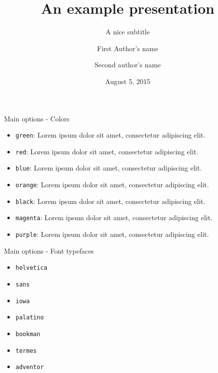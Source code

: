 \documentclass[10pt,numbering,toc]{bpslides}
\title[Short title]{An example presentation}
\subtitle{A nice subtitle}
\author[Short Authors Name]{First Author's name\inst{1} \and Second author's name\inst{2}}
\institute{\inst{1} First institute\vs\\\inst{2} Second institute}
\date[Short date]{August 5, 2015}
\begin{document}
\begin{frame}[plain]
	\titlepage
\end{frame}

\begin{frame}{Main options - Colors}\label{firstslide}
\begin{itemize}
\item \texttt{green}: {\color{green0}Lorem ipsum dolor sit amet, consectetur adipiscing elit}.\hfill {}
\item \texttt{red}: {\color{red0}Lorem ipsum dolor sit amet, consectetur adipiscing elit}.
\item \texttt{blue}: {\color{blue0}Lorem ipsum dolor sit amet, consectetur adipiscing elit}.
\item \texttt{orange}: {\color{orange0}Lorem ipsum dolor sit amet, consectetur adipiscing elit}.
\item \texttt{black}: {\color{black}Lorem ipsum dolor sit amet, consectetur adipiscing elit}.
\item \texttt{magenta}: {\color{magenta0}Lorem ipsum dolor sit amet, consectetur adipiscing elit}.
\item \texttt{purple}: {\color{purple0}Lorem ipsum dolor sit amet, consectetur adipiscing elit}.
\end{itemize}
\end{frame}

\begin{frame}{Main options - Font typefaces}\label{firstslide}
\begin{itemize}
\item \texttt{helvetica}
\item \texttt{sans}
\item \texttt{iowa}
\item \texttt{palatino}
\item \texttt{bookman}
\item \texttt{termes}
\item \texttt{adventor}
\end{itemize}
\end{frame}
\end{document}
